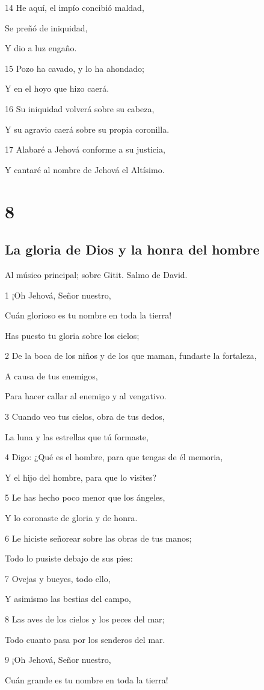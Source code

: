 \par 14 He aquí, el impío concibió maldad,
\par Se preñó de iniquidad,
\par Y dio a luz engaño.
\par 15 Pozo ha cavado, y lo ha ahondado;
\par Y en el hoyo que hizo caerá.
\par 16 Su iniquidad volverá sobre su cabeza,
\par Y su agravio caerá sobre su propia coronilla.
\par 17 Alabaré a Jehová conforme a su justicia,
\par Y cantaré al nombre de Jehová el Altísimo.

\chapter{8}

\section*{La gloria de Dios y la honra del hombre}

\par Al músico principal; sobre Gitit. Salmo de David.

\par 1 ¡Oh Jehová, Señor nuestro,
\par Cuán glorioso es tu nombre en toda la tierra!
\par Has puesto tu gloria sobre los cielos;
\par 2 De la boca de los niños y de los que maman, fundaste la fortaleza,
\par A causa de tus enemigos,
\par Para hacer callar al enemigo y al vengativo.
\par 3 Cuando veo tus cielos, obra de tus dedos,
\par La luna y las estrellas que tú formaste,
\par 4 Digo: ¿Qué es el hombre, para que tengas de él memoria,
\par Y el hijo del hombre, para que lo visites?
\par 5 Le has hecho poco menor que los ángeles,
\par Y lo coronaste de gloria y de honra.
\par 6 Le hiciste señorear sobre las obras de tus manos;
\par Todo lo pusiste debajo de sus pies:
\par 7 Ovejas y bueyes, todo ello,
\par Y asimismo las bestias del campo,
\par 8 Las aves de los cielos y los peces del mar;
\par Todo cuanto pasa por los senderos del mar.
\par 9 ¡Oh Jehová, Señor nuestro,
\par Cuán grande es tu nombre en toda la tierra!

